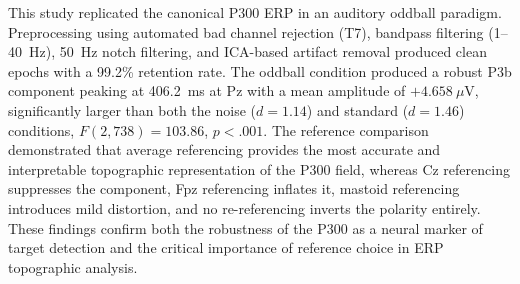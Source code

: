 \documentclass[11pt, a4paper, twocolumn]{article}
\begin{document}
This study replicated the canonical P300 ERP in an auditory oddball
paradigm. Preprocessing using automated bad channel rejection (T7),
bandpass filtering (1--40~Hz), 50~Hz notch filtering, and ICA-based
artifact removal produced clean epochs with a 99.2\% retention rate.
The oddball condition produced a robust P3b component peaking at 406.2~ms
at Pz with a mean amplitude of $+4.658\ \mu$V, significantly larger than
both the noise ($d = 1.14$) and standard ($d = 1.46$) conditions,
$F(2, 738) = 103.86$, $p < .001$. The reference comparison demonstrated
that average referencing provides the most accurate and interpretable
topographic representation of the P300 field, whereas Cz referencing
suppresses the component, Fpz referencing inflates it, mastoid referencing
introduces mild distortion, and no re-referencing inverts the polarity
entirely. These findings confirm both the robustness of the P300 as a
neural marker of target detection and the critical importance of reference
choice in ERP topographic analysis.



\end{document}
